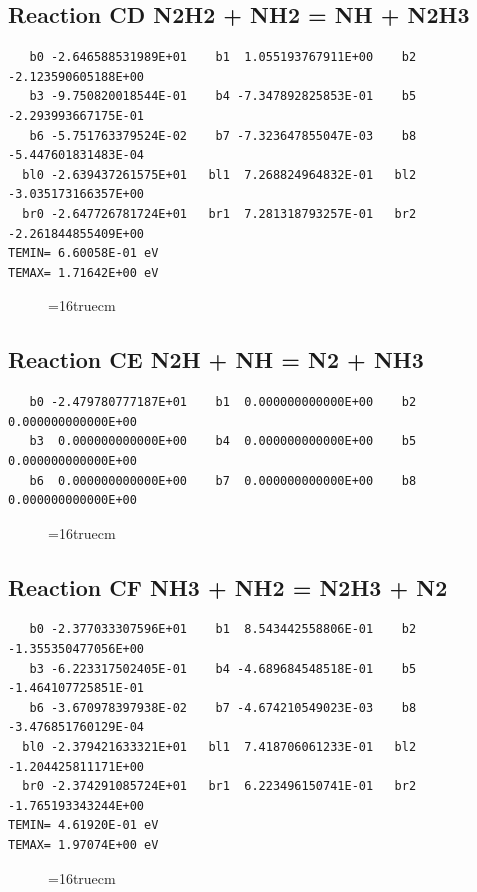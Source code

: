 \documentclass[12pt,dvipdfm]{article}
\begin{document}
\subsection{
Reaction CD N2H2 + NH2  = NH + N2H3 }
\begin{small}\begin{verbatim}
   b0 -2.646588531989E+01    b1  1.055193767911E+00    b2 -2.123590605188E+00
   b3 -9.750820018544E-01    b4 -7.347892825853E-01    b5 -2.293993667175E-01
   b6 -5.751763379524E-02    b7 -7.323647855047E-03    b8 -5.447601831483E-04
  bl0 -2.639437261575E+01   bl1  7.268824964832E-01   bl2 -3.035173166357E+00
  br0 -2.647726781724E+01   br1  7.281318793257E-01   br2 -2.261844855409E+00
TEMIN= 6.60058E-01 eV
TEMAX= 1.71642E+00 eV
   \end{verbatim}\end{small}
\begin{figure}[h!]
\label{n2rates}
\epsfxsize=16truecm
\end{figure}
\newpage

\subsection{
Reaction CE N2H + NH = N2 + NH3}
\begin{small}\begin{verbatim}
   b0 -2.479780777187E+01    b1  0.000000000000E+00    b2  0.000000000000E+00
   b3  0.000000000000E+00    b4  0.000000000000E+00    b5  0.000000000000E+00
   b6  0.000000000000E+00    b7  0.000000000000E+00    b8  0.000000000000E+00
   \end{verbatim}\end{small}
\begin{figure}[h!]
\label{n2rates}
\epsfxsize=16truecm
\end{figure}
\newpage

\subsection{
Reaction CF NH3 + NH2  = N2H3 + N2 }
\begin{small}\begin{verbatim}
   b0 -2.377033307596E+01    b1  8.543442558806E-01    b2 -1.355350477056E+00
   b3 -6.223317502405E-01    b4 -4.689684548518E-01    b5 -1.464107725851E-01
   b6 -3.670978397938E-02    b7 -4.674210549023E-03    b8 -3.476851760129E-04
  bl0 -2.379421633321E+01   bl1  7.418706061233E-01   bl2 -1.204425811171E+00
  br0 -2.374291085724E+01   br1  6.223496150741E-01   br2 -1.765193343244E+00
TEMIN= 4.61920E-01 eV
TEMAX= 1.97074E+00 eV
   \end{verbatim}\end{small}
\begin{figure}[h!]
\label{n2rates}
\epsfxsize=16truecm
\end{figure}
\newpage
\end{document}

